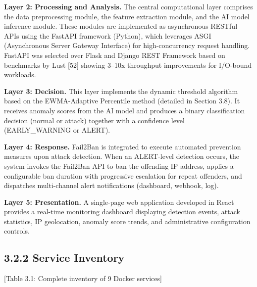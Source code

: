 \documentclass[
  a4paper]{report}
\begin{document}
\textbf{Layer 2: Processing and Analysis.} The central computational
layer comprises the data preprocessing module, the feature extraction
module, and the AI model inference module. These modules are implemented
as asynchronous RESTful APIs using the FastAPI framework (Python), which
leverages ASGI (Asynchronous Server Gateway Interface) for
high-concurrency request handling. FastAPI was selected over Flask and
Django REST Framework based on benchmarks by Lust {[}52{]} showing
3--10x throughput improvements for I/O-bound workloads.

\textbf{Layer 3: Decision.} This layer implements the dynamic threshold
algorithm based on the EWMA-Adaptive Percentile method (detailed in
Section 3.8). It receives anomaly scores from the AI model and produces
a binary classification decision (normal or attack) together with a
confidence level (EARLY\_WARNING or ALERT).

\textbf{Layer 4: Response.} Fail2Ban is integrated to execute automated
prevention measures upon attack detection. When an ALERT-level detection
occurs, the system invokes the Fail2Ban API to ban the offending IP
address, applies a configurable ban duration with progressive escalation
for repeat offenders, and dispatches multi-channel alert notifications
(dashboard, webhook, log).

\textbf{Layer 5: Presentation.} A single-page web application developed
in React provides a real-time monitoring dashboard displaying detection
events, attack statistics, IP geolocation, anomaly score trends, and
administrative configuration controls.

\subsection{3.2.2 Service Inventory}\label{service-inventory}

{[}Table 3.1: Complete inventory of 9 Docker services{]}
\end{document}
